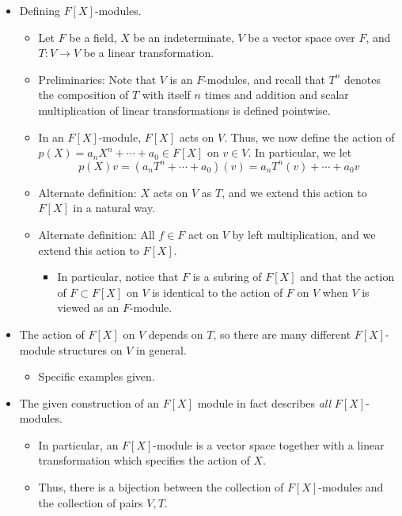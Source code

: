 \documentclass[../notes.tex]{subfiles}
\begin{document}
\begin{itemize}
\begin{itemize}
        \item Defining $F[X]$-modules.
        \begin{itemize}
            \item Let $F$ be a field, $X$ be an indeterminate, $V$ be a vector space over $F$, and $T:V\to V$ be a linear transformation.
            \item Preliminaries: Note that $V$ is an $F$-modules, and recall that $T^n$ denotes the composition of $T$ with itself $n$ times and addition and scalar multiplication of linear transformations is defined pointwise.
            \item In an $F[X]$-module, $F[X]$ acts on $V$. Thus, we now define the action of $p(X)=a_nX^n+\cdots+a_0\in F[X]$ on $v\in V$. In particular, we let
            \begin{equation*}
                p(X)v = (a_nT^n+\cdots+a_0)(v)
                = a_nT^n(v)+\cdots+a_0v
            \end{equation*}
            \item Alternate definition: $X$ acts on $V$ as $T$, and we extend this action to $F[X]$ in a natural way.
            \item Alternate definition: All $f\in F$ act on $V$ by left multiplication, and we extend this action to $F[X]$.
            \begin{itemize}
                \item In particular, notice that $F$ is a subring of $F[X]$ and that the action of $F\subset F[X]$ on $V$ is identical to the action of $F$ on $V$ when $V$ is viewed as an $F$-module.
            \end{itemize}
        \end{itemize}
        \item The action of $F[X]$ on $V$ depends on $T$, so there are many different $F[X]$-module structures on $V$ in general.
        \begin{itemize}
            \item Specific examples given.
        \end{itemize}
        \item The given construction of an $F[X]$ module in fact describes \emph{all} $F[X]$-modules.
        \begin{itemize}
            \item In particular, an $F[X]$-module is a vector space together with a linear transformation which specifies the action of $X$.
            \item Thus, there is a bijection between the collection of $F[X]$-modules and the collection of pairs $V,T$.

\end{itemize}
\end{itemize}
\end{itemize}
\end{document}
